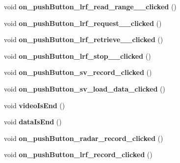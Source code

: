 \begin{DoxyCompactItemize}
\item 
\hypertarget{class_main_window_a2c81d9cfcad930466479607522e36eaa}{}void {\bfseries on\+\_\+push\+Button\+\_\+lrf\+\_\+read\+\_\+range\+\_\+\_\+clicked} ()\label{class_main_window_a2c81d9cfcad930466479607522e36eaa}

\item 
\hypertarget{class_main_window_afac5020a493ff060448673b5ad3920e3}{}void {\bfseries on\+\_\+push\+Button\+\_\+lrf\+\_\+request\+\_\+\_\+clicked} ()\label{class_main_window_afac5020a493ff060448673b5ad3920e3}

\item 
\hypertarget{class_main_window_a5ec349ab159f70611a7fd64e4cd48fbf}{}void {\bfseries on\+\_\+push\+Button\+\_\+lrf\+\_\+retrieve\+\_\+\_\+clicked} ()\label{class_main_window_a5ec349ab159f70611a7fd64e4cd48fbf}

\item 
\hypertarget{class_main_window_aade7a81064c1a04e9863d7885474f007}{}void {\bfseries on\+\_\+push\+Button\+\_\+lrf\+\_\+stop\+\_\+\_\+clicked} ()\label{class_main_window_aade7a81064c1a04e9863d7885474f007}

\item 
\hypertarget{class_main_window_aecbc68b9687bc55197d908f7b0e91a4c}{}void {\bfseries on\+\_\+push\+Button\+\_\+sv\+\_\+record\+\_\+clicked} ()\label{class_main_window_aecbc68b9687bc55197d908f7b0e91a4c}

\item 
\hypertarget{class_main_window_a5cd6ccb54d1eb823b3941ba911f4f70e}{}void {\bfseries on\+\_\+push\+Button\+\_\+sv\+\_\+load\+\_\+data\+\_\+clicked} ()\label{class_main_window_a5cd6ccb54d1eb823b3941ba911f4f70e}

\item 
\hypertarget{class_main_window_ad4db82c551e11268855e8537051854d9}{}void {\bfseries video\+Is\+End} ()\label{class_main_window_ad4db82c551e11268855e8537051854d9}

\item 
\hypertarget{class_main_window_a694e910969f3c9fc52fb2d55e37433d9}{}void {\bfseries data\+Is\+End} ()\label{class_main_window_a694e910969f3c9fc52fb2d55e37433d9}

\item 
\hypertarget{class_main_window_aacc0ca43d4f93d6fd02db9fa701a0c7a}{}void {\bfseries on\+\_\+push\+Button\+\_\+radar\+\_\+record\+\_\+clicked} ()\label{class_main_window_aacc0ca43d4f93d6fd02db9fa701a0c7a}

\item 
\hypertarget{class_main_window_ae621318f159e48b46baa39a789d2f6ca}{}void {\bfseries on\+\_\+push\+Button\+\_\+lrf\+\_\+record\+\_\+clicked} ()\label{class_main_window_ae621318f159e48b46baa39a789d2f6ca}


\end{DoxyCompactItemize}
